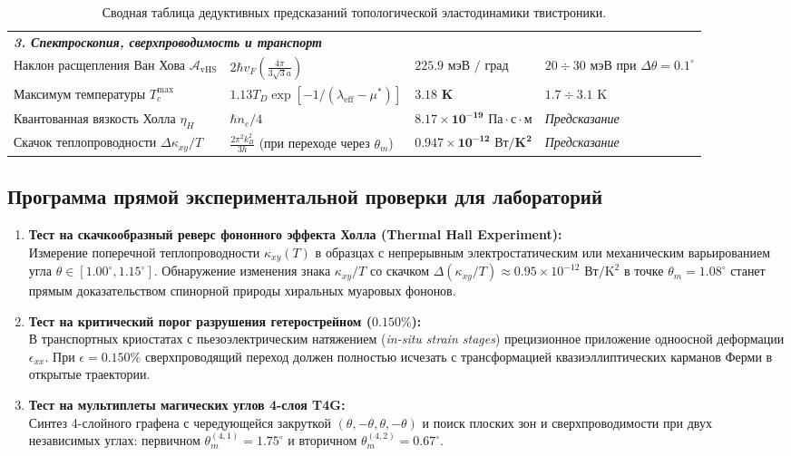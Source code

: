 \documentclass[12pt,a4paper]{article}
\begin{document}
\begin{table}[H]
\begin{tabularx}{\textwidth}{p{3.4cm} p{5.2cm} p{3.8cm} >{\raggedleft\arraybackslash}X}
		\midrule
		\multicolumn{4}{l}{\textit{\textbf{3. Спектроскопия, сверхпроводимость и транспорт}}} \\
		Наклон расщепления Ван Хова $\mathcal{A}_{\text{vHS}}$ & $2\hbar v_F (\frac{4\pi}{3\sqrt{3}a})$ & $\mathbf{225.9\text{ мэВ / град}}$ & $20 \div 30\text{ мэВ}$ при $\Delta\theta=0.1^\circ$ \\
		Максимум температуры $T_c^{\text{max}}$ & $1.13 T_D \exp[-1/(\lambda_{\text{eff}}-\mu^*)]$ & $\mathbf{3.18\text{ K}}$ & $1.7 \div 3.1\text{ K}$ \\
		Квантованная вязкость Холла $\eta_H$ & $\hbar n_e / 4$ & $\mathbf{8.17 \times 10^{-19}\text{ Па}\cdot\text{с}\cdot\text{м}}$ & \textit{Предсказание} \\
		Скачок теплопроводности $\Delta\kappa_{xy}/T$ & $\frac{2\pi^2 k_B^2}{3 h}$ (при переходе через $\theta_m$) & $\mathbf{0.947 \times 10^{-12}\text{ Вт}/\text{K}^2}$ & \textit{Предсказание} \\
		\bottomrule
	\end{tabularx}
	\caption{Сводная таблица дедуктивных предсказаний топологической эластодинамики твистроники.}
	\label{tab:twistronics_summary_corrected}
\end{table}

\subsection{Программа прямой экспериментальной проверки для лабораторий}

\begin{enumerate}
	\item \textbf{Тест на скачкообразный реверс фононного эффекта Холла (Thermal Hall Experiment):}\\
	Измерение поперечной теплопроводности $\kappa_{xy}(T)$ в образцах с непрерывным электростатическим или механическим варьированием угла $\theta \in [1.00^\circ, 1.15^\circ]$. Обнаружение изменения знака $\kappa_{xy}/T$ со скачком $\Delta(\kappa_{xy}/T) \approx 0.95 \times 10^{-12}\text{ Вт}/\text{K}^2$ в точке $\theta_m = 1.08^\circ$ станет прямым доказательством спинорной природы хиральных муаровых фононов.
	
	\item \textbf{Тест на критический порог разрушения гетерострейном ($0.150\%$):}\\
	В транспортных криостатах с пьезоэлектрическим натяжением (\textit{in-situ strain stages}) прецизионное приложение одноосной деформации $\epsilon_{xx}$. При $\epsilon = 0.150\%$ сверхпроводящий переход должен полностью исчезать с трансформацией квазиэллиптических карманов Ферми в открытые траектории.
	
	\item \textbf{Тест на мультиплеты магических углов 4-слоя T4G:}\\
	Синтез 4-слойного графена с чередующейся закруткой $(\theta, -\theta, \theta, -\theta)$ и поиск плоских зон и сверхпроводимости при двух независимых углах: первичном $\theta_m^{(4,1)} = 1.75^\circ$ и вторичном $\theta_m^{(4,2)} = 0.67^\circ$.
\end{enumerate}
\end{document}
